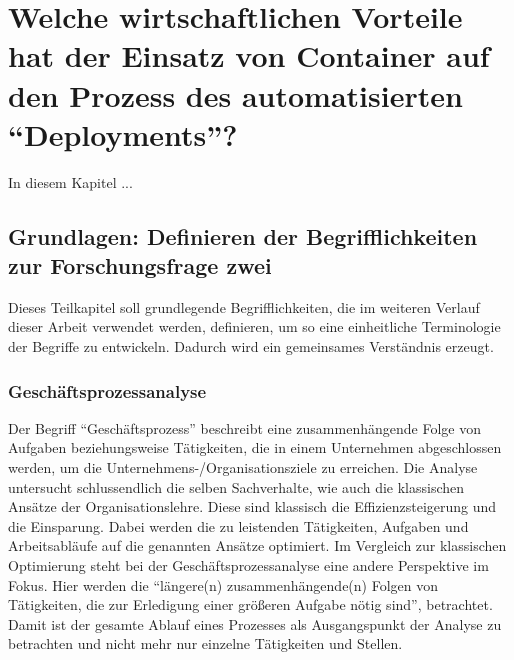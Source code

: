 \chapter[Forschungsfrage 2]{Welche wirtschaftlichen Vorteile hat der Einsatz von Container auf den Prozess des automatisierten \enquote{Deployments}?} \label{ff2}
In diesem Kapitel ...

\section{Grundlagen: Definieren der Begrifflichkeiten zur Forschungsfrage zwei}
Dieses Teilkapitel soll grundlegende Begrifflichkeiten, die im weiteren Verlauf dieser Arbeit verwendet werden, definieren, um so eine einheitliche Terminologie der Begriffe zu entwickeln. Dadurch wird ein gemeinsames Verständnis erzeugt.

\subsection{Geschäftsprozessanalyse}
Der Begriff \enquote{Geschäftsprozess} beschreibt eine zusammenhängende Folge von Aufgaben beziehungsweise Tätigkeiten, die in einem Unternehmen abgeschlossen werden, um die Unternehmens-/Organisationsziele zu erreichen. Die Analyse untersucht schlussendlich die selben Sachverhalte, wie auch die klassischen Ansätze der Organisationslehre. \autocite[vgl.][S.5]{staud_geschaftsprozessanalyse_2006} Diese sind klassisch die Effizienzsteigerung und die Einsparung. Dabei werden die zu leistenden Tätigkeiten, Aufgaben und Arbeitsabläufe auf die genannten Ansätze optimiert. Im Vergleich zur klassischen Optimierung steht bei der Geschäftsprozessanalyse eine andere Perspektive im Fokus. Hier werden die \enquote{längere(n) zusammenhängende(n) Folgen von Tätigkeiten, die zur Erledigung einer größeren Aufgabe nötig sind}\autocite[][S.5]{staud_geschaftsprozessanalyse_2006}, betrachtet. Damit ist der gesamte Ablauf eines Prozesses als Ausgangspunkt der Analyse zu betrachten und nicht mehr nur einzelne Tätigkeiten und Stellen. \par 

